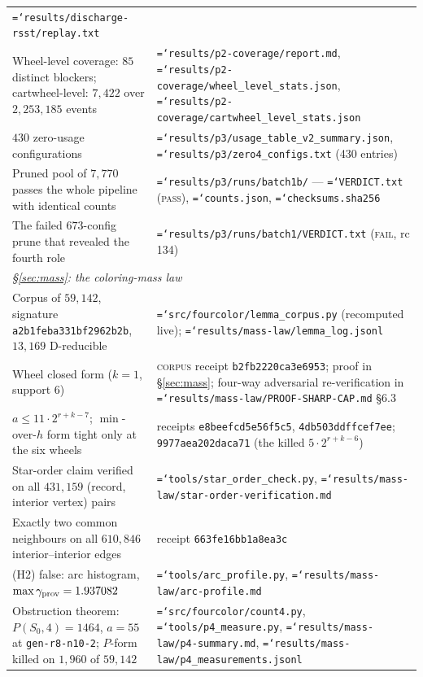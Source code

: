 \documentclass[11pt]{article}
\theoremstyle{definition}
\newcommand{\art}[1]{{\texttt{\hyphenchar\font=`\-\relax #1}}}
\begin{document}
{\begin{longtable}{p{}p{}}
  \art{results/discharge-rsst/replay.txt} \\
Wheel-level coverage: $85$ distinct blockers; cartwheel-level: $7{,}422$ over
  $2{,}253{,}185$ events &
  \art{results/p2-coverage/report.md},
  \art{results/p2-coverage/wheel\_level\_stats.json},
  \art{results/p2-coverage/cartwheel\_level\_stats.json} \\
$430$ zero-usage configurations &
  \art{results/p3/usage\_table\_v2\_summary.json},
  \art{results/p3/zero4\_configs.txt} (430 entries) \\
Pruned pool of $7{,}770$ passes the whole pipeline with identical counts &
  \art{results/p3/runs/batch1b/} --- \art{VERDICT.txt} (\textsc{pass}),
  \art{counts.json}, \art{checksums.sha256} \\
The failed $673$-config prune that revealed the fourth role &
  \art{results/p3/runs/batch1/VERDICT.txt} (\textsc{fail}, rc 134) \\
\midrule
\multicolumn{2}{l}{\emph{\S\ref{sec:mass}: the coloring-mass law}}\\[2pt]
Corpus of $59{,}142$, signature \texttt{a2b1feba331bf2962b2b}, $13{,}169$ D-reducible &
  \art{src/fourcolor/lemma\_corpus.py} (recomputed live);
  \art{results/mass-law/lemma\_log.jsonl} \\
Wheel closed form ($k=1$, support 6) & \textsc{corpus} receipt
  \texttt{b2fb2220ca3e6953}; proof in \S\ref{sec:mass}; four-way adversarial
  re-verification in \art{results/mass-law/PROOF-SHARP-CAP.md} \S6.3 \\
$a \le 11\cdot2^{r+k-7}$; $\min$-over-$h$ form tight only at the six wheels &
  receipts \texttt{e8beefcd5e56f5c5}, \texttt{4db503ddffcef7ee};
  \texttt{9977aea202daca71} (the killed $5\cdot2^{r+k-6}$) \\
Star-order claim verified on all $431{,}159$ (record, interior vertex) pairs &
  \art{tools/star\_order\_check.py},
  \art{results/mass-law/star-order-verification.md} \\
Exactly two common neighbours on all $610{,}846$ interior--interior edges &
  receipt \texttt{663fe16bb1a8ea3c} \\
(H2) false: arc histogram, $\max\gamma_{\rm prov}=1.937082$ &
  \art{tools/arc\_profile.py}, \art{results/mass-law/arc-profile.md} \\
Obstruction theorem: $P(S_0,4)=1464$, $a=55$ at \texttt{gen-r8-n10-2};
  $P$-form killed on $1{,}960$ of $59{,}142$ &
  \art{src/fourcolor/count4.py}, \art{tools/p4\_measure.py},
  \art{results/mass-law/p4-summary.md},
  \art{results/mass-law/p4\_measurements.jsonl} \\

\end{longtable}}
\end{document}
